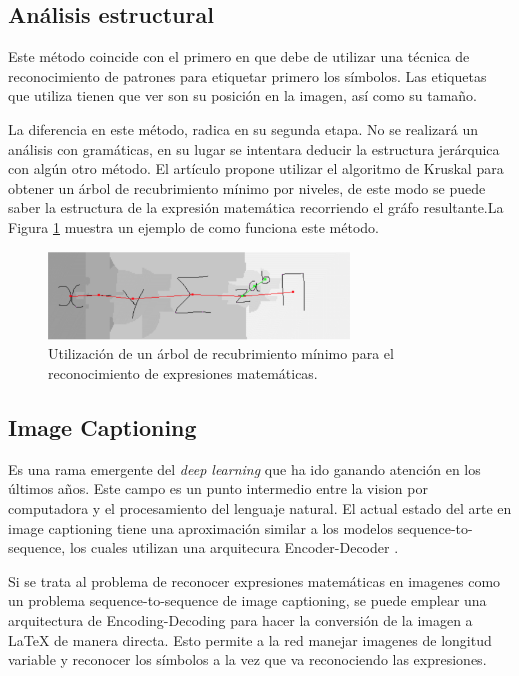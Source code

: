 \subsection{Análisis estructural}

Este método coincide con el primero en que debe de utilizar una técnica de reconocimiento de patrones para etiquetar primero los símbolos. Las etiquetas que utiliza tienen que ver son su posición en la imagen, así como su tamaño. 

La diferencia en este método, radica en su segunda etapa. No se realizará un análisis con gramáticas, en su lugar se intentara deducir la estructura jerárquica con algún otro método. El artículo \cite{spanningtree} propone utilizar el algoritmo de Kruskal para obtener un árbol de recubrimiento mínimo por niveles, de este modo se puede saber la estructura de la expresión matemática recorriendo el gráfo resultante.La Figura \ref{fig:spanningtree} muestra un ejemplo de como funciona este método.

\begin{figure}[h]
	\centering
	\includegraphics[width=8cm]{capitulo2/images/spanningtree}
	\caption{Utilización de un árbol de recubrimiento mínimo para el reconocimiento de expresiones matemáticas.}
	\label{fig:spanningtree}
\end{figure}


\subsection{Image Captioning}

Es una rama emergente del \textit{deep learning} que ha ido ganando atención en los últimos años. Este campo es un punto intermedio entre la vision por computadora y el procesamiento del lenguaje natural. El actual estado del arte en image captioning tiene una aproximación similar a los modelos sequence-to-sequence, los cuales utilizan una arquitecura Encoder-Decoder \cite{imagetolatex}.

Si se trata al problema de reconocer expresiones matemáticas en imagenes como un problema sequence-to-sequence de image captioning, se puede emplear una arquitectura de Encoding-Decoding para hacer la conversión de la imagen a LaTeX de manera directa. Esto permite a la red manejar imagenes de longitud variable y reconocer los símbolos a la vez que va reconociendo las expresiones.

